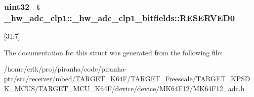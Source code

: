 \subsubsection[{\texorpdfstring{R\+E\+S\+E\+R\+V\+E\+D0}{RESERVED0}}]{\setlength{\rightskip}{0pt plus 5cm}uint32\+\_\+t \+\_\+hw\+\_\+adc\+\_\+clp1\+::\+\_\+hw\+\_\+adc\+\_\+clp1\+\_\+bitfields\+::\+R\+E\+S\+E\+R\+V\+E\+D0}\hypertarget{struct__hw__adc__clp1_1_1__hw__adc__clp1__bitfields_ae5b4e71fca4ff42a292d9f6f10117449}{}\label{struct__hw__adc__clp1_1_1__hw__adc__clp1__bitfields_ae5b4e71fca4ff42a292d9f6f10117449}
\mbox{[}31\+:7\mbox{]} 

The documentation for this struct was generated from the following file\+:\begin{DoxyCompactItemize}
\item 
/home/erik/proj/piranha/code/piranha-\/ptc/src/receiver/mbed/\+T\+A\+R\+G\+E\+T\+\_\+\+K64\+F/\+T\+A\+R\+G\+E\+T\+\_\+\+Freescale/\+T\+A\+R\+G\+E\+T\+\_\+\+K\+P\+S\+D\+K\+\_\+\+M\+C\+U\+S/\+T\+A\+R\+G\+E\+T\+\_\+\+M\+C\+U\+\_\+\+K64\+F/device/device/\+M\+K64\+F12/M\+K64\+F12\+\_\+adc.\+h\end{DoxyCompactItemize}
